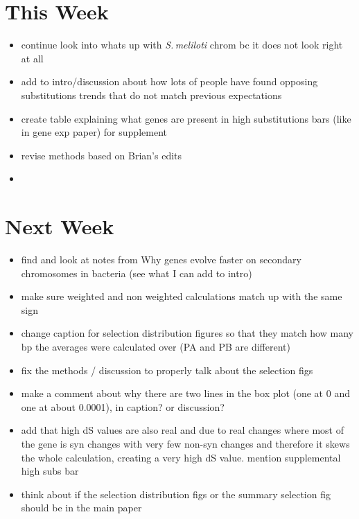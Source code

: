 \documentclass[12pt]{article}
\newcommand{\smel}{\textit{S.\,meliloti}\xspace}
\begin{document}

\section*{This Week}
%
\begin{itemize}
	\item continue look into whats up with \smel chrom bc it does not look right at all
\item add to intro/discussion about how lots of people have found opposing substitutions trends that do not match previous expectations
\item create table explaining what genes are present in high substitutions bars (like in gene exp paper) for supplement
\item  revise methods based on Brian's edits
\item 
\end{itemize}


\section*{Next Week}
\begin{itemize}
\item find and look at notes from Why genes evolve faster on secondary chromosomes in bacteria (see what I can add to intro)
\item make sure weighted and non weighted calculations match up with the same sign
\item change caption for selection distribution figures so that they match how many bp the averages were calculated over (PA and PB are different)
\item fix the methods / discussion to properly talk about the selection figs
\item make a comment about why there are two lines in the box plot (one at 0 and one at about 0.0001), in caption? or discussion?
\item add that high dS values are also real and due to real changes where most of the gene is syn changes with very few non-syn changes and therefore it skews the whole calculation, creating a very high dS value. mention supplemental high subs bar
\item think about if the selection distribution figs or the summary selection fig should be in the main paper
\end{itemize}
\end{document}
